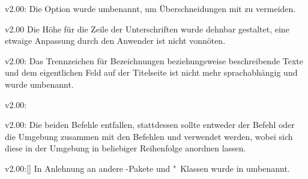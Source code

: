 \begin{Obsolete}{v2.00:}{}
\printobsoletelist%
%
Die Option wurde umbenannt, um Überschneidungen mit  zu 
vermeiden.
\end{Obsolete}

\begin{Obsolete}{v2.00}{}
\printobsoletelist%
%
Die Höhe für die Zeile der Unterschriften wurde dehnbar gestaltet, eine etwaige 
Anpassung durch den Anwender ist nicht vonnöten.
\end{Obsolete}

\begin{Obsolete}{v2.00:}{}%
\printobsoletelist%
%
Das Trennzeichen für Bezeichnungen beziehungsweise beschreibende Texte und dem 
eigentlichen Feld auf der Titelseite ist nicht mehr sprachabhängig und wurde 
umbenannt.
\end{Obsolete}

\begin{Obsolete}{v2.00:}{}
\begin{Obsolete}{v2.00:}{}
\printobsoletelist%
%
Die beiden Befehle entfallen, stattdessen sollte entweder der Befehl 
 oder die Umgebung  zusammen mit 
den Befehlen  und  verwendet werden, 
wobei sich diese in der Umgebung in beliebiger Reihenfolge anordnen lassen.
\end{Obsolete}
\end{Obsolete}

\begin{Obsolete}{v2.00:}{[]}
\printobsoletelist%
%
In Anlehnung an andere -Pakete und "~Klassen wurde 
 in  umbenannt.
\end{Obsolete}

